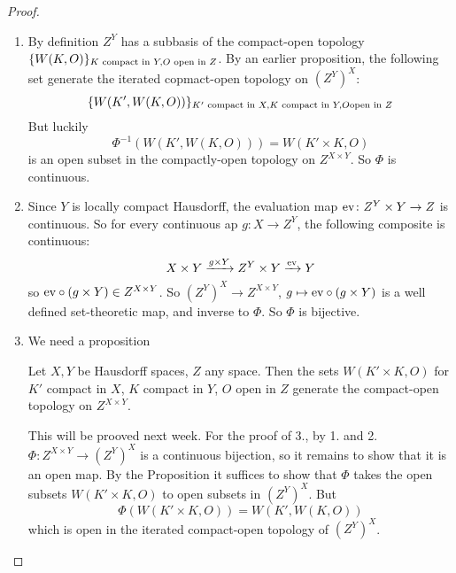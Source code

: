 \documentclass[language=english]{TemplateLecture}
\begin{document}
\begin{proof}
    \begin{enumerate}
        \item By definition \(Z^Y\) has a subbasis of the compact-open topology \(\{W(K,O)\}_{K \text{ compact in } Y, O \text{ open in } Z}\). By an earlier proposition, the following set generate the iterated copmact-open topology on \((Z^Y)^X\):
        \[\{W(K', W(K,O))\}_{K' \text{ compact in }X, K \text{ compact in } Y, O \text{open in } Z}\]
        But luckily
        \[\Phi^{-1}(W(K', W(K,O))) = W(K' \times K, O)\]
        is an open subset in the compactly-open topology on \(Z^{X\times Y}\). So \(\Phi\) is continuous.
        \item Since \(Y\) is locally compact Hausdorff, the evaluation map \(\mathrm{ev}\colon Z^Y \times Y \to Z\) is continuous. So for every continuous ap \(g\colon X \to Z^Y\), the following composite is continuous:
        \[X\times Y \xrightarrow{g \times Y} Z^Y \times Y \xrightarrow{\mathrm{ev}} Y\]
        so \(\mathrm{ev} \circ (g \times Y) \in Z^{X\times Y}\). So \((Z^Y)^X \to Z^{X\times Y}\), \(g \mapsto \mathrm{ev} \circ (g \times Y)\) is a well defined set-theoretic map, and inverse to \(\Phi\). So \(\Phi\) is bijective.
        \item We need a proposition
        \begin{proposition}
            Let \(X,Y\) be Hausdorff spaces, \(Z\) any space. Then the sets \(W(K'\times K, O)\) for \(K'\) compact in \(X\), \(K\) compact in \(Y\), \(O\) open in \(Z\) generate the compact-open topology on \(Z^{X \times Y}\).
        \end{proposition}
        This will be prooved next week.
        For the proof of 3., by 1. and 2. \(\Phi\colon Z^{X\times Y} \to (Z^Y)^X\) is a continuous bijection, so it remains to show that it is an open map. By the Proposition it suffices to show that \(\Phi\) takes the open subsets \(W(K' \times K, O)\) to open subsets in \((Z^Y)^X\). But
        \[\Phi(W(K'\times K, O)) = W(K', W(K,O))\]
        which is open in the iterated compact-open topology of \((Z^Y)^X\).
    \end{enumerate}
\end{proof}
\end{document}
